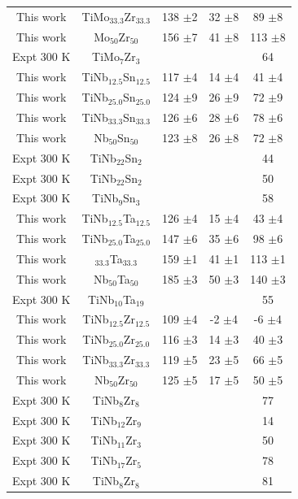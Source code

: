\begin{longtable}[H]{ c c c c c }
	This work & TiMo$_{33.3}$Zr$_{33.3}$ & 138 $\pm$2 & 32 $\pm$8 & 89 $\pm$8\\
	This work & Mo$_{50}$Zr$_{50}$ & 156 $\pm$7 & 41 $\pm$8 & 113 $\pm$8\\
	Expt 300 K \cite{Mohammed2014} & TiMo$_{7}$Zr$_{3}$ & & & 64\\
	This work & TiNb$_{12.5}$Sn$_{12.5}$ & 117 $\pm$4 & 14 $\pm$4 & 41 $\pm$4\\
	This work & TiNb$_{25.0}$Sn$_{25.0}$ & 124 $\pm$9 & 26 $\pm$9 & 72 $\pm$9\\
	This work & TiNb$_{33.3}$Sn$_{33.3}$ & 126 $\pm$6 & 28 $\pm$6 & 78 $\pm$6\\
	This work & Nb$_{50}$Sn$_{50}$ & 123 $\pm$8 & 26 $\pm$8 & 72 $\pm$8\\
	Expt 300 K \cite{Mohammed2014} & TiNb$_{22}$Sn$_{2}$ & & & 44\\
	Expt 300 K \cite{Niinomi2012} & TiNb$_{22}$Sn$_{2}$ & & & 50\\
	Expt 300 K \cite{Nozoe2007} & TiNb$_{9}$Sn$_{3}$ & & & 58\\
	This work & TiNb$_{12.5}$Ta$_{12.5}$ & 126 $\pm$4 & 15 $\pm$4 & 43 $\pm$4\\
	This work & TiNb$_{25.0}$Ta$_{25.0}$ & 147 $\pm$6 & 35 $\pm$6 & 98 $\pm$6\\
	This work & $_{33.3}$Ta$_{33.3}$ & 159 $\pm$1 & 41 $\pm$1 & 113 $\pm$1\\
	This work & Nb$_{50}$Ta$_{50}$ & 185 $\pm$3 & 50 $\pm$3 & 140 $\pm$3\\
	Expt 300 K \cite{Mohammed2014} & TiNb$_{10}$Ta$_{19}$ & & & 55\\
	This work & TiNb$_{12.5}$Zr$_{12.5}$ & 109 $\pm$4 & -2 $\pm$4 & -6 $\pm$4\\
	This work & TiNb$_{25.0}$Zr$_{25.0}$ & 116 $\pm$3 & 14 $\pm$3 & 40 $\pm$3\\
	This work & TiNb$_{33.3}$Zr$_{33.3}$ & 119 $\pm$5 & 23 $\pm$5 & 66 $\pm$5\\
	This work & Nb$_{50}$Zr$_{50}$ & 125 $\pm$5 & 17 $\pm$5 & 50 $\pm$5\\
	Expt 300 K \cite{Mohammed2014} & TiNb$_{8}$Zr$_{8}$ & & & 77\\
	Expt 300 K \cite{Mohammed2014} & TiNb$_{12}$Zr$_{9}$ & & & 14\\
	Expt 300 K \cite{Mohammed2014} & TiNb$_{11}$Zr$_{3}$ & & & 50\\
	Expt 300 K \cite{Niinomi2012} & TiNb$_{17}$Zr$_{5}$ & & & 78\\
	Expt 300 K \cite{Geetha2009} & TiNb$_{8}$Zr$_{8}$ & & & 81\\

\end{longtable}

